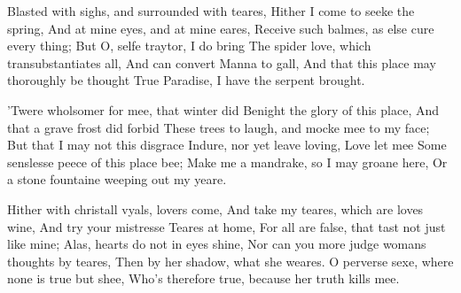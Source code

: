 \documentclass{book}
\newenvironment{poem}[1]%
  {\poemtitle{#1}%
   \Versus
   \numerus{1}%
  }
  {\endVersus}
\begin{document}
    
\begin{poem}{Twicknam garden}  %
\Forma {}
\Locus \textus {\previous}      
      
  Blasted with sighs, and surrounded with teares,        
    Hither I come to seeke the spring, \auto       
    And at mine eyes, and at mine eares,        
  Receive such balmes, as else cure every thing;        
    But O, selfe traytor, I do bring       
  The spider love, which transubstantiates all,        
    And can convert Manna to gall,        
  And that this place may thoroughly be thought        
    True Paradise, I have the serpent brought.        
       
  'Twere wholsomer for mee, that winter did       
    Benight the glory of this place,        
    And that a grave frost did forbid        
  These trees to laugh, and mocke mee to my face;        
    But that I may not this disgrace        
  Indure, nor yet leave loving, Love let mee       
    Some senslesse peece of this place bee;        
  Make me a mandrake, so I may groane here,        
    Or a stone fountaine weeping out my yeare.        
       
  Hither with christall vyals, lovers come,        
    And take my teares, which are loves wine,       
    And try your mistresse Teares at home,        
  For all are false, that tast not just like mine;        
    Alas, hearts do not in eyes shine,        
  Nor can you more judge womans thoughts by teares,        
    Then by her shadow, what she weares.       
  O perverse sexe, where none is true but shee,        
    Who's therefore true, because her truth kills mee.        
\end{poem}
      
\end{document}
